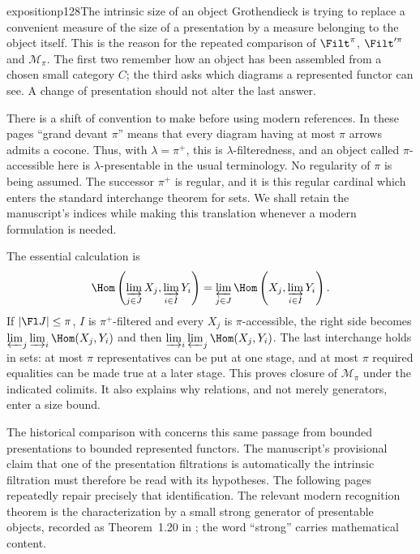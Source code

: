
\begin{dcomment}{exposition}{p128}{The intrinsic size of an object}
Grothendieck is trying to replace a convenient measure of the size of a presentation by a measure belonging to the object itself. This is the reason for the repeated comparison of $\Filt^{\pi}$, $\Filt'^{\pi}$ and $\mathcal M_\pi$. The first two remember how an object has been assembled from a chosen small category $C$; the third asks which diagrams a represented functor can see. A change of presentation should not alter the last answer.

There is a shift of convention to make before using modern references. In these pages ``grand devant $\pi$'' means that every diagram having at most $\pi$ arrows admits a cocone. Thus, with $\lambda=\pi^+$, this is $\lambda$-filteredness, and an object called $\pi$-accessible here is $\lambda$-presentable in the usual terminology. No regularity of $\pi$ is being assumed. The successor $\pi^+$ is regular, and it is this regular cardinal which enters the standard interchange theorem for sets. We shall retain the manuscript's indices while making this translation whenever a modern formulation is needed.

The essential calculation is
\[
 \Hom\left(\varinjlim_{j\in J}X_j,\varinjlim_{i\in I}Y_i\right)
 =\varprojlim_{j\in J}\Hom\left(X_j,\varinjlim_{i\in I}Y_i\right).
\]
If $|\Fl J|\leq\pi$, $I$ is $\pi^+$-filtered and every $X_j$ is $\pi$-accessible, the right side becomes
$\varprojlim_j\varinjlim_i\Hom(X_j,Y_i)$ and then
$\varinjlim_i\varprojlim_j\Hom(X_j,Y_i)$. The last interchange holds in sets: at most $\pi$ representatives can be put at one stage, and at most $\pi$ required equalities can be made true at a later stage. This proves closure of $\mathcal M_\pi$ under the indicated colimits. It also explains why relations, and not merely generators, enter a size bound.

The historical comparison with \citet[Expos\'e~I, \S9]{SGA4I1972} concerns this same passage from bounded presentations to bounded represented functors. The manuscript's provisional claim that one of the presentation filtrations is automatically the intrinsic filtration must therefore be read with its hypotheses. The following pages repeatedly repair precisely that identification. The relevant modern recognition theorem is the characterization by a small strong generator of presentable objects, recorded as Theorem~1.20 in \citet{AdamekRosicky1994}; the word ``strong'' carries mathematical content.
\end{dcomment}

